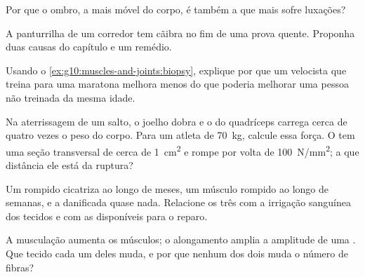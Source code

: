 \begin{exercise}[$\star\star$]\label{exo:g10:muscles-and-joints:9}
Por que o ombro, a  mais móvel do corpo, é também a que mais
sofre luxações?
\end{exercise}

\begin{exercise}[$\star\star$]\label{exo:g10:muscles-and-joints:10}
A panturrilha de um corredor tem cãibra no fim de uma prova quente.
Proponha duas causas do capítulo e um remédio.
\end{exercise}

\begin{exercise}[$\star\star$]\label{exo:g10:muscles-and-joints:11}
Usando o \cref{ex:g10:muscles-and-joints:biopsy}, explique por que um
velocista que treina para uma maratona melhora menos do que poderia
melhorar uma pessoa não treinada da mesma idade.
\end{exercise}

\begin{exercise}[$\star\star\star$]\label{exo:g10:muscles-and-joints:12}
Na aterrissagem de um salto, o joelho dobra e o  do quadríceps
carrega cerca de quatro vezes o peso do corpo. Para um atleta de
\qty{70}{kg}, calcule essa força. O  tem uma seção transversal de
cerca de \qty{1}{cm^2} e rompe por volta de \qty{100}{N/mm^2}; a que
distância ele está da ruptura?
\end{exercise}

\begin{exercise}[$\star\star\star$]\label{exo:g10:muscles-and-joints:13}
Um  rompido cicatriza ao longo de meses, um músculo rompido ao
longo de semanas, e a  danificada quase nada. Relacione os
três com a irrigação sanguínea dos tecidos e com as  disponíveis
para o reparo.
\end{exercise}

\begin{exercise}[$\star\star\star$]\label{exo:g10:muscles-and-joints:14}
A musculação aumenta os músculos; o alongamento amplia a amplitude de
uma . Que tecido cada um deles muda, e por que nenhum dos
dois muda o número de fibras?
\end{exercise}

